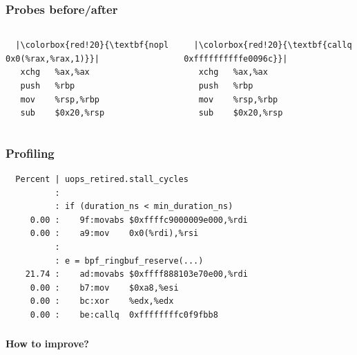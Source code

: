 \documentclass[usenames,dvipsnames, 18pt, compress, aspectratio=169]{beamer}
\begin{document}
\begin{frame}[fragile]{}
    \frametitle{Probes before/after}

    \begin{center}
        \begin{columns}
            \begin{column}{0.5\textwidth}
                \begin{verbatim}
  |\colorbox{red!20}{\textbf{nopl   0x0(%rax,%rax,1)}}|
   xchg   %ax,%ax
   push   %rbp
   mov    %rsp,%rbp
   sub    $0x20,%rsp
               \end{verbatim}
           \end{column}

           \begin{column}{0.5\textwidth}
                \begin{verbatim}
  |\colorbox{red!20}{\textbf{callq  0xffffffffffe0096c}}|
   xchg   %ax,%ax
   push   %rbp
   mov    %rsp,%rbp
   sub    $0x20,%rsp
                \end{verbatim}
            \end{column}
        \end{columns}
    \end{center}
\end{frame}

\begin{frame}[fragile]{}
    \frametitle{Profiling}

    \begin{center}
        \begin{verbatim}
  Percent | uops_retired.stall_cycles
          :
          : if (duration_ns < min_duration_ns)
     0.00 :    9f:movabs $0xffffc9000009e000,%rdi
     0.00 :    a9:mov    0x0(%rdi),%rsi
          :
          : e = bpf_ringbuf_reserve(...)
    21.74 :    ad:movabs $0xffff888103e70e00,%rdi
     0.00 :    b7:mov    $0xa8,%esi
     0.00 :    bc:xor    %edx,%edx
     0.00 :    be:callq  0xffffffffc0f9fbb8
        \end{verbatim}
    \end{center}
\end{frame}

\fontsize{26pt}{26}\selectfont
\begin{frame}[fragile]{}
    \frametitle{}

    \begin{center}
        \textbf{How to improve?}
    \end{center}
\end{frame}
\end{document}
